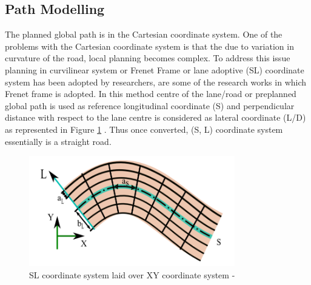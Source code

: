 
\subsection{Path Modelling} \label{frenet_frame}

 The planned global path is in the Cartesian coordinate system. One of the problems with the Cartesian coordinate system is that the due to variation in curvature of the road, local planning becomes complex. To address this issue planning in curvilinear system or Frenet Frame or  lane adoptive (SL) coordinate system has been adopted by researchers, \cite{traj_planner_optimization} \cite{spatio_temporal_state_lattice} \cite{diss_shui_phd_thesis} \cite{real_time_traj_plan_article} \cite{volvo_reactive_traj} \cite{curvilinear_System_Automated_Drv} are some of the research works in which Frenet frame is adopted. In this method centre of the lane/road or preplanned global path is used as reference longitudinal coordinate (S) and perpendicular distance with respect to the lane centre is considered as lateral coordinate (L/D) as represented in Figure \ref{sl_over_xy} \cite{diss_shui_phd_thesis}.  Thus once converted, (S, L) coordinate system essentially is a straight road.
 
 \begin{figure}[H]
    \centering
    \includegraphics[width=0.8\textwidth]{Images/sl_over_xy.png}
    \caption{SL coordinate system laid over XY coordinate system - \cite{diss_shui_phd_thesis}}
    \label{sl_over_xy}
\end{figure}
 
